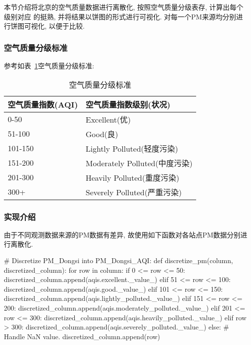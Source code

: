 本节介绍将北京的空气质量数据进行离散化, 按照空气质量分级表存, 计算出每个级别对应
的挺熟, 并将结果以饼图的形式进行可视化. 对每一个PM来源均分别进行饼图可视化, 以便于比较.

\subsubsection{空气质量分级标准}
参考如表~\ref{tab:空气质量分级标准}空气质量分级标准:
\begin{table}[ht!]
    \centering
    \begin{tabular}{|l|l|}
        \hline
        空气质量指数(AQI) & 空气质量指数级别(状况)              \\
        \hline
        \hline
        0-50        & Excellent(优)              \\
        51-100      & Good(良)                   \\
        101-150     & Lightly Polluted(轻度污染)    \\
        151-200     & Moderately Polluted(中度污染) \\
        201-300     & Heavily Polluted(重度污染)    \\
        300+        & Severely Polluted(严重污染)   \\
        \hline
    \end{tabular}
    \caption{空气质量分级标准}
    \label{tab:空气质量分级标准}
\end{table}

\subsubsection{实现介绍}
由于不同观测数据来源的PM数据有差异, 故使用如下函数对各站点PM数据分别进行离散化.
\begin{python}
    # Discretize PM_Dongsi into PM_Dongsi_AQI:
    def discretize_pm(column, discretized_column):
        for row in column:
            if 0 <= row <= 50:
                discretized_column.append(aqis.excellent._value_)
            elif 51 <= row <= 100:
                discretized_column.append(aqis.good._value_)
            elif 101 <= row <= 150:
                discretized_column.append(aqis.lightly_polluted._value_)
            elif 151 <= row <= 200:
                discretized_column.append(aqis.moderately_polluted._value_)
            elif 201 <= row <= 300:
                discretized_column.append(aqis.heavily_polluted._value_)
            elif row > 300:
                discretized_column.append(aqis.severely_polluted._value_)
            else:
                # Handle NaN value.
                discretized_column.append(row)
\end{python}

